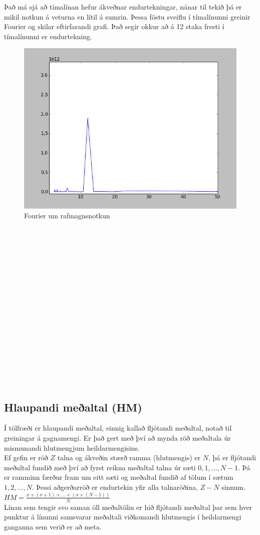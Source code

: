 \documentclass[11pt]{article}
\begin{document}
Það má sjá að tímalínan hefur ákveðnar endurtekningar, nánar til tekið þá er mikil notkun á veturna en lítil á sumrin.
Þessa föstu sveiflu í tímalínunni greinir Fourier og skilar eftirfarandi grafi. 
Það segir okkur að á 12 staka fresti í tímalínunni er endurtekning.
\begin{figure}
 \begin{center}
 \includegraphics[width=.45\textwidth]{Fourier.png}
 \caption{Fourier um rafmagnsnotkun}
  \end{center}
\end{figure}
\hfill
\\\\\\\\\\\\\\\\\\\\\\\\\\\\\\\

\subsection{Hlaupandi meðaltal (HM)}
Í tölfræði er hlaupandi meðaltal, einnig kallað fljótandi meðaltal, notað til greiningar á gagnamengi. 
Er það gert með því að mynda röð meðaltala úr mismunandi hlutmengjum heildarmengisins.\\
Ef gefin er röð $Z$ talna og ákveðin stærð ramma (hlutmengis) er $N$, þá er fljótandi meðaltal fundið með því að fyrst reikna meðaltal 
talna úr sæti $0,1,\dots,N-1$. Þá er ramminn færður fram um eitt sæti og meðaltal fundið af tölum í sætum $1,2,\dots,N$. 
Þessi aðgerðarröð er endurtekin yfir alla talnaröðina, $Z-N$ sinnum.  \\
$HM = \frac{x+(x+1)+\dots+(x+(N-1))}{N}$
\\
Línan sem tengir svo saman öll meðaltölin er hið fljótandi meðaltal þar sem hver punktur á línunni samsvarar 
meðaltali viðkomandi hlutmengis í heildarmengi ganganna sem verið er að meta. 
 
\end{document}
